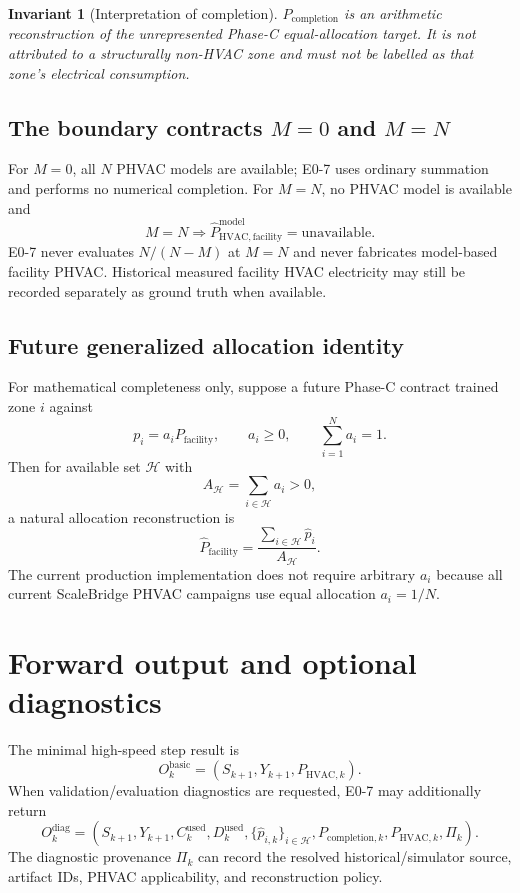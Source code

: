 \documentclass[11pt]{article}
\newcommand{\Diag}{\Pi}
\newtheorem{invariant}{Invariant}
\begin{document}
\begin{invariant}[Interpretation of completion]
$P_{\mathrm{completion}}$ is an arithmetic reconstruction of the unrepresented
Phase-C equal-allocation target. It is not attributed to a structurally
non-HVAC zone and must not be labelled as that zone's electrical consumption.
\end{invariant}

\subsection{The boundary contracts $M=0$ and $M=N$}
For $M=0$, all $N$ PHVAC models are available; E0-7 uses ordinary summation and
performs no numerical completion. For $M=N$, no PHVAC model is available and
\[
\boxed{M=N\Longrightarrow
\hat P_{\mathrm{HVAC,facility}}^{\mathrm{model}}=\text{unavailable}.}
\]
E0-7 never evaluates $N/(N-M)$ at $M=N$ and never fabricates model-based
facility PHVAC. Historical measured facility HVAC electricity may still be
recorded separately as ground truth when available.

\subsection{Future generalized allocation identity}
For mathematical completeness only, suppose a future Phase-C contract trained
zone $i$ against
\[
p_i=a_iP_{\mathrm{facility}},
\qquad a_i\ge0,
\qquad \sum_{i=1}^{N}a_i=1.
\]
Then for available set $\mathcal H$ with
\[
A_{\mathcal H}=\sum_{i\in\mathcal H}a_i>0,
\]
a natural allocation reconstruction is
\[
\boxed{
\hat P_{\mathrm{facility}}
=\frac{\sum_{i\in\mathcal H}\hat p_i}{A_{\mathcal H}}.
}
\]
The current production implementation does not require arbitrary $a_i$ because
all current ScaleBridge PHVAC campaigns use equal allocation $a_i=1/N$.

\section{Forward output and optional diagnostics}

The minimal high-speed step result is
\[
\boxed{
O_k^{\mathrm{basic}}=(S_{k+1},Y_{k+1},P_{\mathrm{HVAC},k}).
}
\]
When validation/evaluation diagnostics are requested, E0-7 may additionally
return
\[
\boxed{
O_k^{\mathrm{diag}}=
(S_{k+1},Y_{k+1},C_k^{\mathrm{used}},D_k^{\mathrm{used}},
\{\hat p_{i,k}\}_{i\in\mathcal H},P_{\mathrm{completion},k},
P_{\mathrm{HVAC},k},\Diag_k).
}
\]
The diagnostic provenance $\Diag_k$ can record the resolved historical/simulator
source, artifact IDs, PHVAC applicability, and reconstruction policy.
\end{document}
